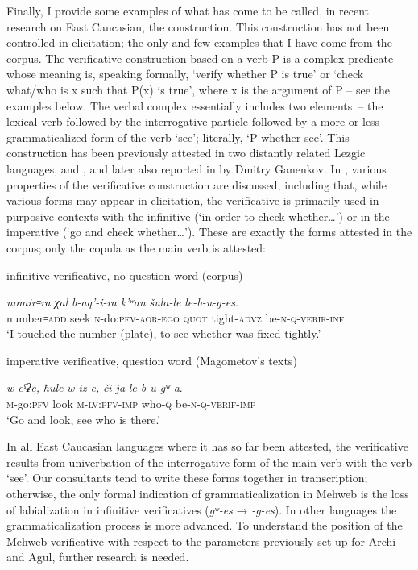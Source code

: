 \documentclass[output=paper]{langsci/langscibook}
\begin{document}
Finally, I provide some examples of what has come to be called, in
recent research on East Caucasian, the  construction. This
construction has not been controlled in elicitation; the only and few
examples that I have come from the corpus. The verificative construction
based on a verb P is a complex predicate whose meaning is, speaking
formally, `verify whether P is true' or `check what/who is x such that
P(x) is true', where x is the argument of P – see the examples below.
The verbal complex essentially includes two elements~– the lexical verb
followed by the interrogative particle followed by a more or less
grammaticalized form of the verb `see'; literally, `P-whether-see'. This
construction has been previously attested in two distantly related
Lezgic languages,  \citep[291]{kibrik1977} and  \citep{maisak-merdanova2004},
and later also reported in  by Dmitry Ganenkov. In \citet{daniel-maisak2014,maisak2016},
various properties of the verificative construction
are discussed, including that, while various forms may appear in
elicitation, the verificative is primarily used in purposive contexts
with the infinitive (`in order to check whether\ldots{}') or in the
imperative (`go and check whether\ldots{}'). These are exactly the forms
attested in the corpus; only the copula as the main verb is attested:

\ea %
infinitive verificative, no question word (corpus)

\gll \emph{nomir꞊ra} \emph{χal} \emph{b-aq'-i-ra} \emph{k'ʷan} \emph{šula-le} \emph{le-b-u-g-es}.\\
number꞊\textsc{add} seek \textsc{n}-do:\textsc{pfv}-\textsc{aor}-\textsc{ego} \textsc{quot} tight-\textsc{advz} be-\textsc{n}-\textsc{q}-\textsc{verif}-\textsc{inf}\\
\glt  `I touched the number (plate), to see whether was fixed tightly.'

\ex %
imperative verificative, question word (Magometov's texts)

\gll \emph{w-eˤʡe,} \emph{ħule} \emph{w-iz-e,} \emph{či-ja} \emph{le-b-u-gʷ-a}.\\
\textsc{m}-go:\textsc{pfv} look \textsc{m}-\textsc{lv}:\textsc{pfv}-\textsc{imp} who-\textsc{q} be-\textsc{n}-\textsc{q}-\textsc{verif}-\textsc{imp}\\
\glt `Go and look, see who is there.'
\z

In all East Caucasian languages where it has so far been attested, the
verificative results from univerbation of the interrogative form of the
main verb with the verb `see'. Our consultants tend to write these forms
together in transcription; otherwise,
the only formal indication of grammaticalization in Mehweb is the loss
of labialization in infinitive
verificatives (\emph{gʷ-es} → \emph{-g-es}). In other
languages the grammaticalization process is more advanced. To understand
the position of the Mehweb verificative with respect to the parameters
previously set up for Archi and Agul, further research is needed.
%
\end{document}
